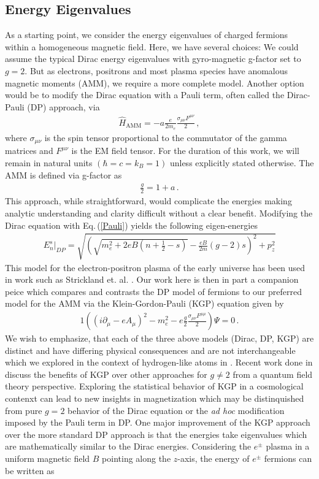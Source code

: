 \documentclass[Universe,article,submit,moreauthors,pdftex]{Definitions/mdpi}
\newcommand{\req}[1]{Eq.\,(\ref{#1})}
\begin{document}
\subsection{Energy Eigenvalues}\label{subsec:energy}
\noindent As a starting point, we consider the energy eigenvalues of charged fermions within a homogeneous magnetic field. Here, we have several choices: We could assume the typical Dirac energy eigenvalues with gyro-magnetic g-factor set to $g=2$. But as electrons, positrons and most plasma species have anomalous magnetic moments (AMM), we require a more complete model. Another option would be to modify the Dirac equation with a Pauli term, often called the Dirac-Pauli (DP) approach, via
\begin{align}
  \label{Pauli} \hat{H}_{\mathrm{AMM}} = -a\frac{e}{2m_{e}}\frac{\sigma_{\mu\nu}F^{\mu\nu}}{2}\,,
\end{align}
where $\sigma_{\mu\nu}$ is the spin tensor proportional to the commutator of the gamma matrices and $F^{\mu\nu}$ is the EM field tensor. For the duration of this work, we will remain in natural units $(\hbar=c=k_{B}=1)$ unless explicitly stated otherwise. The AMM is defined via g-factor as
\begin{align}
  \label{AMM} \frac{g}{2}=1+a\,.
\end{align}
This approach, while straightforward, would complicate the energies making analytic understanding and clarity difficult without a clear benefit. Modifying the Dirac equation with \req{Pauli} yields the following eigen-energies
\begin{align}
  \label{DPEnergy} E_{n}^{s}\vert_{DP}=\sqrt{\left(\sqrt{m_{e}^{2}+2eB\left(n+\frac{1}{2}-s\right)}-\frac{eB}{2m}(g-2)s\right)^{2}+p_{z}^{2}}
\end{align}
This model for the electron-positron plasma of the early universe has been used in work such as Strickland et. al. \cite{Strickland:2012vu}. Our work here is then in part a companion peice which compares and contrasts the DP model of fermions to our preferred model for the AMM via the Klein-Gordon-Pauli (KGP) equation given by
\begin{alignat}{1}
  \label{KGP} \left(\left(i\partial_{\mu}-eA_{\mu}\right)^{2}-m_{e}^{2}-e\frac{g}{2}\frac{\sigma_{\mu\nu}F^{\mu\mu}}{2}\right)\Psi=0\,.
\end{alignat}
We wish to emphasize, that each of the three above models (Dirac, DP, KGP) are distinct and have differing physical consequences and are not interchangeable which we explored in the context of hydrogen-like atoms in \cite{Steinmetz:2018ryf}. Recent work done in \cite{Rafelski:2022bsv} discuss the benefits of KGP over other approaches for $g\neq2$ from a quantum field theory perspective. Exploring the statistical behavior of KGP in a cosmological contenxt can lead to new insights in magnetization which may be distinquished from pure $g=2$ behavior of the Dirac equation or the \emph{ad hoc} modification imposed by the Pauli term in DP. One major improvement of the KGP approach over the more standard DP approach is that the energies take eigenvalues which are mathematically similar to the Dirac energies. Considering the $e^\pm$ plasma in a uniform magnetic field $B$ pointing along the $z$-axis, the energy of $e^\pm$ fermions can be written as
\end{document}
